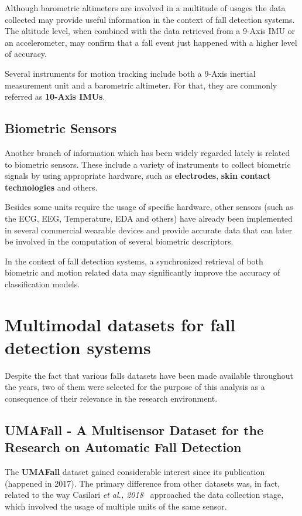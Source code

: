 Although barometric altimeters are involved in a multitude of usages the data collected may provide useful information in the context of fall detection systems. The altitude level, when combined with the data retrieved from a 9-Axis IMU or an accelerometer, may confirm that a fall event just happened with a higher level of accuracy.

Several instruments for motion tracking include both a 9-Axis inertial measurement unit and a barometric altimeter. For that, they are commonly referred as \textbf{10-Axis IMUs}.

\subsection{Biometric Sensors}\label{subsec:biometric-sensors}

Another branch of information which has been widely regarded lately is related to biometric sensors. These include a variety of instruments to collect biometric signals by using appropriate hardware, such as \textbf{electrodes}, \textbf{skin contact technologies} and others.

Besides some units require the usage of specific hardware, other sensors (such as the ECG, EEG, Temperature, EDA and others) have already been implemented in several commercial wearable devices and provide accurate data that can later be involved in the computation of several biometric descriptors. 

In the context of fall detection systems, a synchronized retrieval of both biometric and motion related data may significantly improve the accuracy of classification models.

\section{Multimodal datasets for fall detection systems}\label{sec:datasets}

Despite the fact that various falls datasets have been made available throughout the years, two of them were selected for the purpose of this analysis as a consequence of their relevance in the research environment.

\subsection{UMAFall - A Multisensor Dataset for the Research on Automatic Fall Detection}\label{subsec:umafall}

The \textbf{UMAFall} dataset gained considerable interest since its publication (happened in 2017). The primary difference from other datasets was, in fact, related to the way Casilari \textit{et al., 2018}~\cite{umafall} approached the data collection stage, which involved the usage of multiple units of the same sensor. 

